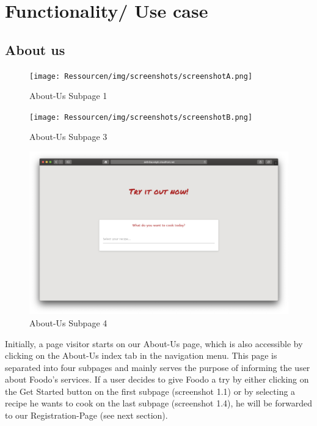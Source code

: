 \chapter{Functionality/ Use case}
\section*{About us}
\vspace{-1em}
\begin{figure}[H]
	\captionsetup{justification=centering}
	\begin{center}
		\texttt{[image: Ressourcen/img/screenshots/screenshotA.png]}
		\vspace{-3em}
		\caption{About-Us Subpage 1}
	\end{center}
\end{figure}
\vspace{-1em}
\begin{figure}[H]
	\captionsetup{justification=centering}
	\begin{center}
		\texttt{[image: Ressourcen/img/screenshots/screenshotB.png]}
		\vspace{-3em}
		\caption{About-Us Subpage 3}
	\end{center}
\end{figure}
\vspace{-1em}
\begin{figure}[H]
	\captionsetup{justification=centering}
	\begin{center}
		\includegraphics[scale=0.30]{Ressourcen/img/screenshots/screenshotC.png}
		\vspace{-3em}
		\caption{About-Us Subpage 4}
	\end{center}
\end{figure}
\vspace{-3em}
Initially, a page visitor starts on our About-Us page, which is also accessible by clicking on the About-Us index tab in the navigation menu. This page is separated into four subpages and mainly serves the purpose of informing the user about Foodo's services. If a user decides to give Foodo a try by either clicking on the Get Started button on the first subpage (screenshot 1.1) or by selecting a recipe he wants to cook on the last subpage (screenshot 1.4), he will be forwarded to our Registration-Page (see next section).
